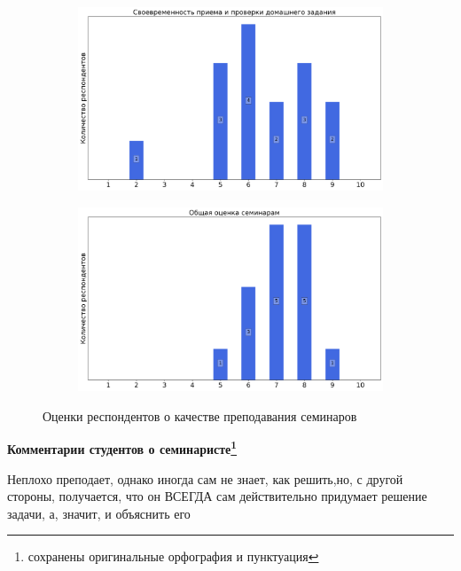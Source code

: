 \begin{figure}[H]
\begin{subfigure}[b]{0.45\textwidth}
			\end{subfigure}
			\begin{subfigure}[b]{0.45\textwidth}
				\centering
				\includegraphics[width=\textwidth]{images/1 course/Общая физика - механика/seminarists-marks-Холин Д.И.-2.png}
			\end{subfigure}
			\begin{subfigure}[b]{0.45\textwidth}
				\centering
				\includegraphics[width=\textwidth]{images/1 course/Общая физика - механика/seminarists-marks-Холин Д.И.-3.png}
			\end{subfigure}	
			\caption{Оценки респондентов о качестве преподавания семинаров}
		\end{figure}

		\textbf{Комментарии студентов о семинаристе\protect\footnote{сохранены оригинальные орфография и пунктуация}}
            \begin{commentbox} 
                Неплохо преподает, однако иногда сам не знает, как решить,но, с другой стороны, получается, что он ВСЕГДА сам действительно придумает решение задачи, а, значит, и объяснить его 
            \end{commentbox} 
        
